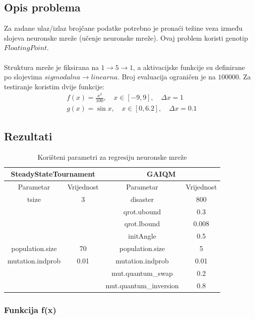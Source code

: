 \documentclass[times, utf8, zavrsni, numeric]{fer}
\begin{document}
\subsection{Opis problema}
Za zadane ulaz/izlaz brojčane podatke potrebno je pronaći težine veza između slojeva neuronske mreže (učenje neuronske mreže). Ovaj problem koristi genotip $FloatingPoint$.

\paragraph{}
Struktura mreže je fiksirana na $1\to 5\to 1$, a aktivacijske funkcije su definirane po slojevima $sigmodalna \to linearna$.
Broj evaluacija ograničen je na $100000$.
Za testiranje koristim dvije funkcije:
\begin{align*}
&f(x) = \frac{x^2}{100},\quad x \in [-9, 9], \quad \Delta x = 1 \\
&g(x) = \sin{x},\quad x \in [0, 6.2], \quad \Delta x = 0.1
\end{align*}

\subsection{Rezultati}
\begin{table}[htb]
\caption{Korišteni parametri za regresiju neuronske mreže}
\centering
\begin{tabular}{|c|c||c|c|} \hline
\multicolumn{2}{|c||}{SteadyStateTournament} & \multicolumn{2}{c|}{GAIQM} \\ 
\hline
Parametar & Vrijednost & Parametar & Vrijednost \\ 
\hline
tsize & 3 & disaster & 800 \\
&& qrot.ubound & 0.3 \\
&& qrot.lbound & 0.008 \\
&& initAngle & 0.5 \\
population.size & 70 & population.size & 5 \\
mutation.indprob & 0.01 & mutation.indprob & 0.01 \\
&& mut.quantum\_swap & 0.2 \\
&& mut.quantum\_inversion & 0.8 \\
\hline
\end{tabular}
\end{table}

\subsubsection{Funkcija f(x)}
\end{document}
